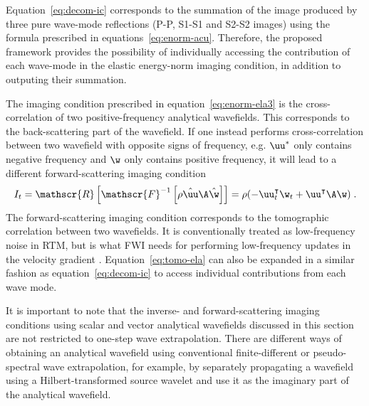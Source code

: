 Equation~\ref{eq:decom-ic} corresponds to the summation of the image produced by three pure wave-mode reflections (P-P, S1-S1 and S2-S2 images) using the formula prescribed in equations~\ref{eq:enorm-acu}. Therefore, the proposed framework provides the possibility of individually accessing the contribution of each wave-mode in the elastic energy-norm imaging condition, in addition to outputing their summation.

The imaging condition prescribed in equation~\ref{eq:enorm-ela3} is the cross-correlation of two positive-frequency analytical wavefields. This corresponds to the back-scattering part of the wavefield. If one instead performs cross-correlation between two wavefield with opposite signs of frequency, e.g. $\uu^*$ only contains negative frequency and $\w$ only contains positive frequency, it will lead to a different forward-scattering imaging condition
\begin{equation}
    \label{eq:tomo-ela}
    I_t = \mathscr{R}\left[ \mathscr{F}^{-1} \left[ \rho \hat{\uu} \A \hat{\w} \right] \right] = \rho ( -\uu_t^\intercal \w_t + \uu^\intercal \A \w ) \;.
\end{equation}
The forward-scattering imaging condition corresponds to the tomographic correlation between two wavefields. It is conventionally treated as low-frequency noise in RTM, but is what FWI needs for performing low-frequency updates in the velocity gradient \cite{diaz12,diaz13,ramos16}. Equation~\ref{eq:tomo-ela} can also be expanded in a similar fashion as equation~\ref{eq:decom-ic} to access individual contributions from each wave mode.

It is important to note that the inverse- and forward-scattering imaging conditions using scalar and vector analytical wavefields discussed in this section are not restricted to one-step wave extrapolation. There are different ways of obtaining an analytical wavefield using conventional finite-different or pseudo-spectral wave extrapolation, for example, by separately propagating a wavefield using a Hilbert-transformed source wavelet \cite[]{shen15,hu16} and use it as the imaginary part of the analytical wavefield.

\begin{comment}
\subsection{Attenuation}
One key advantage of the one-step scheme (equation~\ref{eq:os}) is that attenuation can be directly incorporated into the diagonal matrix of eigenvalues, by simply modifying the phase velocity and adding an amplitude decay term. The reasoning follows from a complex stiffness tensor $\widehat{\C} = \C + i\mathbf{M}$.
\end{comment}

